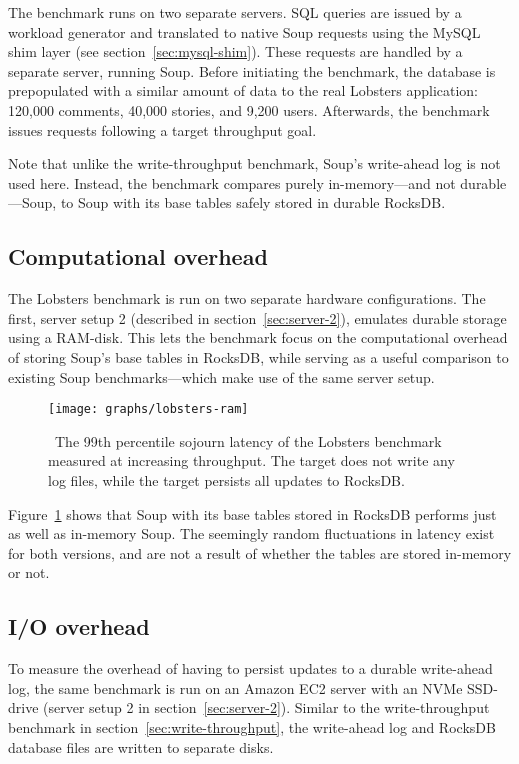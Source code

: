 The benchmark runs on two separate servers. SQL queries are issued by a workload
generator and translated to native Soup requests using the MySQL shim layer (see
section~\ref{sec:mysql-shim}). These requests are handled by a separate server,
running Soup. Before initiating the benchmark, the database is prepopulated with
a similar amount of data to the real Lobsters application: 120,000 comments,
40,000 stories, and 9,200 users. Afterwards, the benchmark issues requests
following a target throughput goal.

Note that unlike the write-throughput benchmark, Soup's write-ahead log is not
used here. Instead, the benchmark compares purely in-memory---and not
durable---Soup, to Soup with its base tables safely stored in durable RocksDB.\@

\subsection{Computational overhead}

The Lobsters benchmark is run on two separate hardware configurations. The
first, server setup 2 (described in section~\ref{sec:server-2}), emulates
durable storage using a
RAM-disk.
This lets the benchmark focus on the computational overhead of storing Soup's
base tables in RocksDB, while serving as a useful comparison to existing Soup
benchmarks---which make use of the same server setup.

\begin{figure}[H]
  \texttt{[image: graphs/lobsters-ram]}
  \caption{\
    The 99th percentile sojourn latency of the Lobsters benchmark measured at
    increasing throughput. The \code{soup} target does not write any log files,
    while the \code{rocksdb\_soup} target persists all updates to RocksDB.
  }\label{fig:lobsters-ram}
\end{figure}

Figure~\ref{fig:lobsters-ram} shows that Soup with its base tables stored in
RocksDB performs just as well as in-memory Soup. The seemingly random
fluctuations in latency exist for both versions, and are not a result of whether
the tables are stored in-memory or not.

\subsection{I/O overhead}

To measure the overhead of having to persist updates to a durable
write-ahead log, the same benchmark is run on an Amazon EC2 server with an NVMe
SSD-drive
(server setup 2 in section~\ref{sec:server-2}). Similar to the write-throughput
benchmark in section~\ref{sec:write-throughput}, the write-ahead log and RocksDB
database files are written to separate disks.

